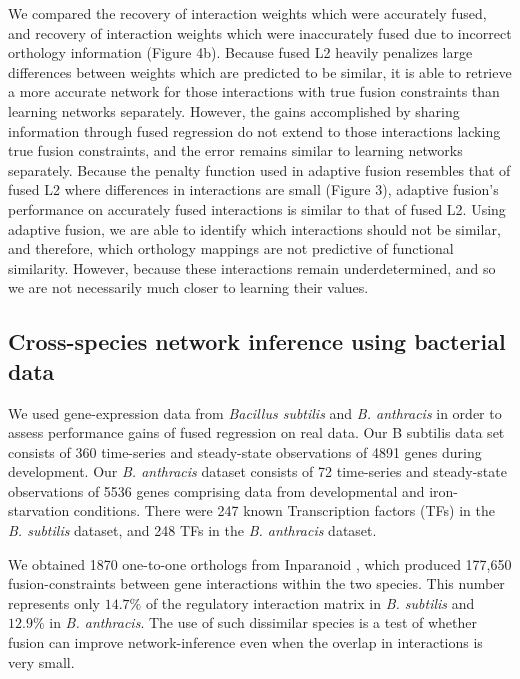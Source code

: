 \documentclass[11pt]{article}
\begin{document}
We compared the recovery of interaction weights which were accurately fused, and recovery of interaction weights which were inaccurately fused due to incorrect orthology information (Figure 4b). Because fused L2 heavily penalizes large differences between weights which are predicted to be similar, it is able to retrieve a more accurate network for those interactions with true fusion constraints than learning networks separately. However, the gains accomplished by sharing information through fused regression do not extend to those interactions lacking true fusion constraints, and the error remains similar to learning networks separately. Because the penalty function used in adaptive fusion resembles that of fused L2 where differences in interactions are small (Figure 3), adaptive fusion's performance on accurately fused interactions is similar to that of fused L2. Using adaptive fusion, we are able to identify which interactions should not be similar, and therefore, which orthology mappings are not predictive of functional similarity. However, because these interactions remain underdetermined, and so we are not necessarily much closer to learning their values.  


\subsection{Cross-species network inference using bacterial data}
We used gene-expression data from \textit{\textit{Bacillus subtilis}} and \textit{\textit{B. anthracis}} in order to assess performance gains of fused regression on real data. Our B subtilis data set consists of 360 time-series and steady-state observations of 4891 genes during development. Our \textit{\textit{B. anthracis}} dataset consists of 72 time-series and steady-state observations of 5536 genes comprising data from developmental and iron-starvation conditions. There were 247 known Transcription factors (TFs) in the \textit{\textit{B. subtilis}} dataset, and 248 TFs in the \textit{B. anthracis} dataset. 

We obtained 1870 one-to-one orthologs from Inparanoid \cite{ostlund_inparanoid_2010}, which produced 177,650 fusion-constraints between gene interactions within the two species. This number represents only $14.7\%$ of the regulatory interaction matrix in \textit{B. subtilis} and $12.9\%$ in \textit{B. anthracis}. The use of such dissimilar species is a test of whether fusion can improve network-inference even when the overlap in interactions is very small. 
\end{document}

